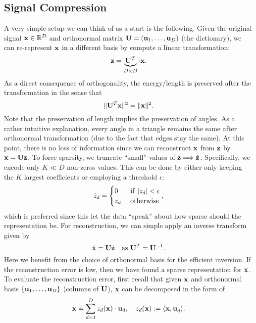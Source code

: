 \documentclass[../book-template.tex]{subfiles}
\begin{document}
\subsection{Signal Compression}
A very simple setup we can think of as a start is the following. Given the original signal ${\bf x}\in \mathbb{R}^D$ and orthonormal matrix ${\bf U}=({\bf u}_1,\dots,{\bf u}_D)$ (the dictionary), we can re-represent ${\bf x}$ in a different basis by compute a linear transformation:
\begin{equation*}
	{\bf z}=\underbrace{{\bf U}^T}_{D\times D}\cdot {\bf x}.
\end{equation*}
As a direct consequence of orthogonality, the energy/length is preserved after the transformation in the sense that
\begin{equation*}
	\|{\bf U}^T{\bf x}\|^2 = \|{\bf x}\|^2.
\end{equation*}
Note that the preservation of length implies the preservation of angles. As a rather intuitive explanation, every angle in a triangle remains the same after orthonormal transformation (due to the fact that edges stay the same). At this point, there is no loss of information since we can reconstruct ${\bf x}$ from ${\bf z}$ by ${\bf x}={\bf Uz}$. To force sparsity, we truncate ``small'' values of ${\bf z}\Longrightarrow\hat{\bf z}$. Specifically, we encode only $K\ll D$ non-zeros values. This can be done by either only keeping the $K$ largest coefficients or employing a threshold $\epsilon$:
\begin{equation*}
	\hat{z}_d=\begin{cases}
	0 &\ {\rm if}\ |z_d|<\epsilon\\
	z_d&\ {\rm otherwise}
	\end{cases},
\end{equation*}
which is preferred since this let the data ``speak'' about how sparse should the representation be. For reconstruction, we can simple apply an inverse transform given by
\begin{equation*}
	\hat{\bf x}={\bf U}\hat{\bf z}\quad{\rm as}\ {\bf U}^T={\bf U}^{-1}.
\end{equation*}
Here we benefit from the choice of orthonormal basis for the efficient inversion. If the reconstruction error is low, then we have found a sparse representation for ${\bf x}$. To evaluate the reconstruction error, first recall that given ${\bf x}$ and orthonormal basis $\{{\bf u}_1,\dots,{\bf u}_D\}$ (columns of ${\bf U}$), ${\bf x}$ can be decomposed in the form of
\begin{equation*}
	{\bf x}=\sum_{d=1}^{D}z_d({\bf x})\cdot {\bf u}_d,\quad z_d({\bf x}):=\langle {\bf x,u}_d\rangle.
\end{equation*}
\end{document}
